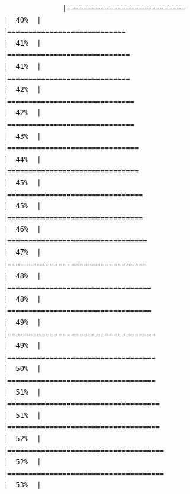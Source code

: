 \documentclass[
]{article}
\begin{document}
\begin{verbatim}
              |============================                                          |  40%  |                                                                              |============================                                          |  41%  |                                                                              |=============================                                         |  41%  |                                                                              |=============================                                         |  42%  |                                                                              |==============================                                        |  42%  |                                                                              |==============================                                        |  43%  |                                                                              |===============================                                       |  44%  |                                                                              |===============================                                       |  45%  |                                                                              |================================                                      |  45%  |                                                                              |================================                                      |  46%  |                                                                              |=================================                                     |  47%  |                                                                              |=================================                                     |  48%  |                                                                              |==================================                                    |  48%  |                                                                              |==================================                                    |  49%  |                                                                              |===================================                                   |  49%  |                                                                              |===================================                                   |  50%  |                                                                              |===================================                                   |  51%  |                                                                              |====================================                                  |  51%  |                                                                              |====================================                                  |  52%  |                                                                              |=====================================                                 |  52%  |                                                                              |=====================================                                 |  53%  |                                                                 
\end{verbatim}
\end{document}
